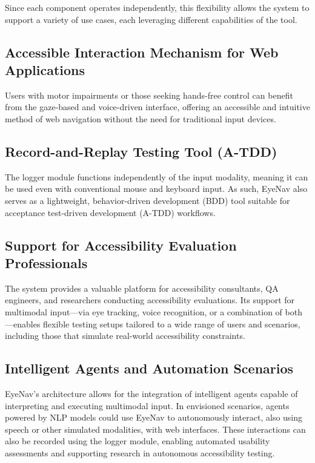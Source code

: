Since each component operates independently, this flexibility allows the system to support a variety of use cases, each leveraging different capabilities of the tool.

\subsection{Accessible Interaction Mechanism for Web Applications}
Users with motor impairments or those seeking hands-free control can benefit from the gaze-based and voice-driven interface, offering an accessible and intuitive method of web navigation without the need for traditional input devices.

\subsection{Record-and-Replay Testing Tool (A-TDD)}

The logger module functions independently of the input modality, meaning it can be used even with conventional mouse and keyboard input. As such, EyeNav also serves as a lightweight, behavior-driven development (BDD) tool suitable for acceptance test-driven development (A-TDD) workflows.

\subsection{Support for Accessibility Evaluation Professionals}

The system provides a valuable platform for accessibility consultants, QA engineers, and researchers conducting accessibility evaluations. Its support for multimodal input—via eye tracking, voice recognition, or a combination of both—enables flexible testing setups tailored to a wide range of users and scenarios, including those that simulate real-world accessibility constraints.

\subsection{Intelligent Agents and Automation Scenarios}

EyeNav's architecture allows for the integration of intelligent agents capable of interpreting and executing multimodal input. In envisioned scenarios, agents powered by NLP models could use EyeNav to autonomously interact, also using speech or other simulated modalities, with web interfaces. These interactions can also be recorded using the logger module, enabling automated usability assessments and supporting research in autonomous accessibility testing.


